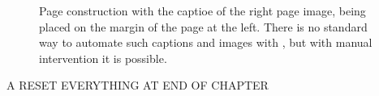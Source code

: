 \begin{figure}[tbp]
\caption{Page construction with the captioe  of the right page image, being placed on the margin of the page at the left. There is no standard way to automate such captions and images with \latexe, but with manual
intervention it is possible.}
\label{elizabeth}
\makeatletter


\end{figure}

\restoregeometry
A RESET EVERYTHING AT END OF CHAPTER


\addtocounter{chapter}{-2}
\@toctrue\@specialtrue

